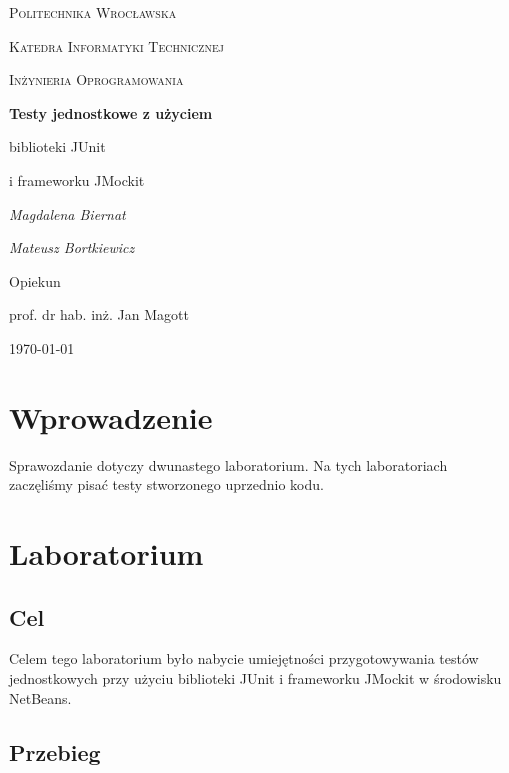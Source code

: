 \documentclass{article}
\begin{document}
	
	\begin{titlepage}
		\centering
		{\scshape\LARGE Politechnika Wrocławska \par}
		{\scshape\Large Katedra Informatyki Technicznej\par}
		
		\vspace{1cm}
		{\scshape\Large Inżynieria Oprogramowania\par}
		\vspace{1.5cm}
		{\huge\bfseries Testy jednostkowe z użyciem\par biblioteki JUnit\par i frameworku JMockit\par}
		\vspace{2cm}
		{\Large\itshape Magdalena Biernat\par}
		{\Large\itshape Mateusz Bortkiewicz\par}
		\vfill
		Opiekun\par
		prof. dr hab. inż. Jan Magott 
		
		\vfill
		{\large \today\par}
	\end{titlepage}
	\newpage
	\section{Wprowadzenie}
	Sprawozdanie dotyczy dwunastego laboratorium. Na tych laboratoriach zaczęliśmy pisać testy stworzonego uprzednio kodu.
	
	\section{Laboratorium}
	\subsection{Cel}
Celem tego laboratorium było nabycie umiejętności przygotowywania testów jednostkowych przy użyciu biblioteki JUnit i frameworku JMockit w środowisku NetBeans. 
\subsection{Przebieg}
\end{document}
